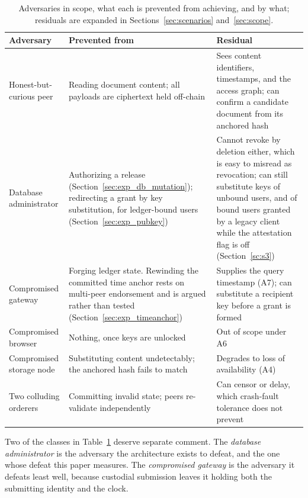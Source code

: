 \documentclass[preprint,12pt]{elsarticle}
\begin{document}
\begin{table}[!t]
\centering
\caption{Adversaries in scope, what each is prevented from achieving, and by
what; residuals are expanded in Sections~\ref{sec:scenarios}
and~\ref{sec:scope}.}
\label{tab:adversaries}
\footnotesize
\setlength{\tabcolsep}{4pt}
\begin{tabular}{@{}>{\raggedright\arraybackslash}p{}%
                 >{\raggedright\arraybackslash}p{}%
                 >{\raggedright\arraybackslash}p{}@{}}
\toprule
Adversary & Prevented from & Residual \\
\midrule
Honest-but-curious peer &
Reading document content; all payloads are ciphertext held off-chain &
Sees content identifiers, timestamps, and the access graph; can confirm a
candidate document from its anchored hash \\
Database administrator &
Authorizing a release (Section~\ref{sec:exp_db_mutation}); redirecting a grant
by key substitution, for ledger-bound users
(Section~\ref{sec:exp_pubkey}) &
Cannot revoke by deletion either, which is easy to misread as revocation; can
still substitute keys of unbound users, and of bound users granted by a legacy
client while the attestation flag is off (Section~\ref{sc:s3}) \\
Compromised gateway &
Forging ledger state. Rewinding the committed time anchor rests on multi-peer
endorsement and is argued rather than tested
(Section~\ref{sec:exp_timeanchor}) &
Supplies the query timestamp (A7); can substitute a recipient key before a
grant is formed \\
Compromised browser &
Nothing, once keys are unlocked &
Out of scope under A6 \\
Compromised storage node &
Substituting content undetectably; the anchored hash fails to match &
Degrades to loss of availability (A4) \\
Two colluding orderers &
Committing invalid state; peers re-validate independently &
Can censor or delay, which crash-fault tolerance does not prevent \\
\bottomrule
\end{tabular}
\end{table}

Two of the classes in Table~\ref{tab:adversaries} deserve separate comment.
The \emph{database administrator} is the adversary the architecture exists
to defeat, and the one whose defeat this paper measures. The
\emph{compromised gateway} is the adversary it defeats least well, because
custodial submission leaves it holding both the submitting identity and the
clock.
\end{document}
